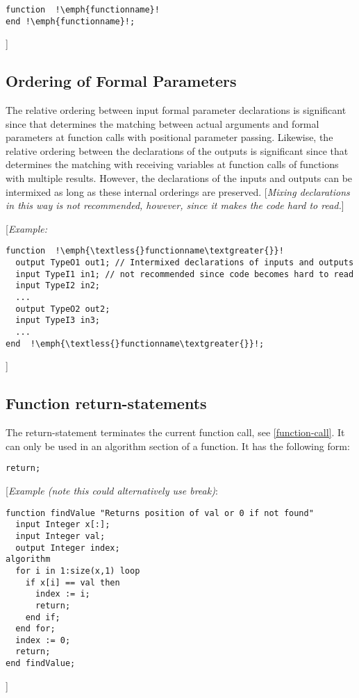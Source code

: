 \begin{lstlisting}[language=modelica,escapechar=!]
function  !\emph{functionname}!
end !\emph{functionname}!; 
\end{lstlisting}
{]}

\subsection{Ordering of Formal Parameters}

The relative ordering between input formal parameter declarations is
significant since that determines the matching between actual arguments
and formal parameters at function calls with positional parameter
passing. Likewise, the relative ordering between the declarations of the
outputs is significant since that determines the matching with receiving
variables at function calls of functions with multiple results. However,
the declarations of the inputs and outputs can be intermixed as long as
these internal orderings are preserved. {[}\emph{Mixing declarations in
this way is not recommended, however, since it makes the code hard to
read.}{]}

{[}\emph{Example:}

\begin{lstlisting}[language=modelica,escapechar=!]
function  !\emph{\textless{}functionname\textgreater{}}!
  output TypeO1 out1; // Intermixed declarations of inputs and outputs
  input TypeI1 in1; // not recommended since code becomes hard to read
  input TypeI2 in2;
  ...
  output TypeO2 out2;
  input TypeI3 in3;
  ...
end  !\emph{\textless{}functionname\textgreater{}}!;
\end{lstlisting}

{]}

\subsection{Function return-statements}

The return-statement terminates the current function call, see \autoref{function-call}. 
It can only be used in an algorithm section of a function. It has
the following form:
\begin{lstlisting}[language=modelica]
return;
\end{lstlisting}

{[}\emph{Example (note this could alternatively use break)}:

\begin{lstlisting}[language=modelica]
function findValue "Returns position of val or 0 if not found"
  input Integer x[:];
  input Integer val;
  output Integer index;
algorithm
  for i in 1:size(x,1) loop
    if x[i] == val then
      index := i;
      return;
    end if;
  end for;
  index := 0;
  return;
end findValue;
\end{lstlisting}
{]}


